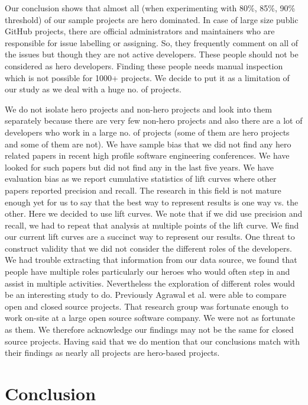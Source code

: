 \documentclass[smallextended]{svjour3}
\begin{document}
Our conclusion shows that almost all (when experimenting with 80\%, 85\%, 90\% threshold) of our sample projects are hero dominated.  In case of large size public GitHub projects, there are official administrators and maintainers who are responsible for issue labelling or assigning. So, they frequently comment on all of the issues but though they are not active developers. These people should not be considered as hero developers. Finding these people needs manual inspection which is not possible for 1000+ projects. We decide to put it as a limitation of our study as we deal with a huge no. of projects.

We do not isolate hero projects and non-hero projects and look into them separately because there are very few non-hero projects and also there are a lot of developers who work in a large no. of projects (some of them are hero projects and some of them are not). We have sample bias that we did not find any hero related papers in recent high profile software engineering conferences. We have looked for such papers but did not find any in the last five years. We have evaluation bias as we report cumulative statistics of lift curves where other papers reported precision and recall. The research in this field is not mature enough yet for us to say that the best way to represent results is one way vs. the other. Here we decided to use lift curves. We note that if we did use precision and recall, we had to repeat that analysis at multiple points of the lift curve. We find our current lift curves are a succinct way to represent our results. One threat to construct validity that we did not consider the different roles of the developers. We had trouble extracting that information from our data source, we found that people have multiple roles particularly our heroes who would often step in and assist in multiple activities.  Nevertheless the exploration of different roles would be an interesting study to do. Previously Agrawal et al. were able to compare open and closed source projects. That research group was fortunate enough to work on-site at a large open source software company. We were not as fortunate as them. We therefore acknowledge our findings may not be the same for closed source projects. Having said that we do mention that our conclusions match with their findings as nearly all projects are hero-based projects.


 

 
\section{Conclusion}
\label{sec:Conclusion}
\end{document}
